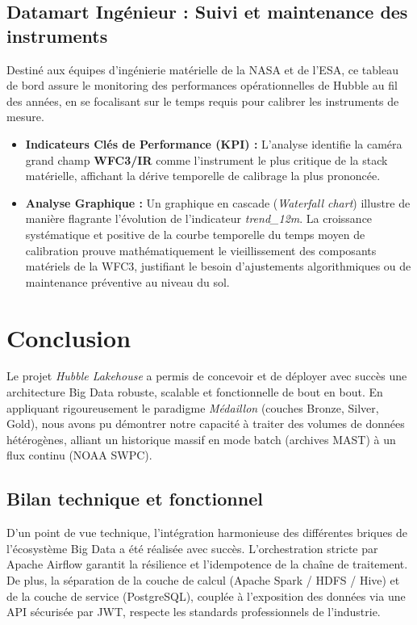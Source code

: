 \documentclass[11pt,a4paper]{article}
\begin{document}
\subsection{Datamart Ingénieur : Suivi et maintenance des instruments}
Destiné aux équipes d'ingénierie matérielle de la NASA et de l'ESA, ce tableau de bord assure le monitoring des performances opérationnelles de Hubble au fil des années, en se focalisant sur le temps requis pour calibrer les instruments de mesure.

\begin{itemize}
    \item \textbf{Indicateurs Clés de Performance (KPI) :} L'analyse identifie la caméra grand champ \textbf{WFC3/IR} comme l'instrument le plus critique de la stack matérielle, affichant la dérive temporelle de calibrage la plus prononcée.
    \item \textbf{Analyse Graphique :} Un graphique en cascade (\textit{Waterfall chart}) illustre de manière flagrante l'évolution de l'indicateur \textit{trend\_12m}. La croissance systématique et positive de la courbe temporelle du temps moyen de calibration prouve mathématiquement le vieillissement des composants matériels de la WFC3, justifiant le besoin d'ajustements algorithmiques ou de maintenance préventive au niveau du sol.
\end{itemize}

\newpage
\section{Conclusion}

Le projet \textit{Hubble Lakehouse} a permis de concevoir et de déployer avec succès une architecture Big Data robuste, scalable et fonctionnelle de bout en bout. En appliquant rigoureusement le paradigme \textit{Médaillon} (couches Bronze, Silver, Gold), nous avons pu démontrer notre capacité à traiter des volumes de données hétérogènes, alliant un historique massif en mode batch (archives MAST) à un flux continu (NOAA SWPC).

\subsection{Bilan technique et fonctionnel}

D'un point de vue technique, l'intégration harmonieuse des différentes briques de l'écosystème Big Data a été réalisée avec succès. L'orchestration stricte par Apache Airflow garantit la résilience et l'idempotence de la chaîne de traitement. De plus, la séparation de la couche de calcul (Apache Spark / HDFS / Hive) et de la couche de service (PostgreSQL), couplée à l'exposition des données via une API sécurisée par JWT, respecte les standards professionnels de l'industrie.
\end{document}
